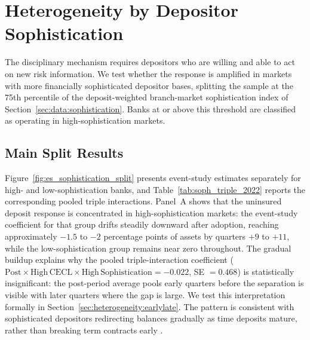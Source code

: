 
\section{Heterogeneity by Depositor Sophistication}
\label{sec:heterogeneity}
\label{sec:results:sophistication}
\label{sec:results:heterogeneity}

The disciplinary mechanism requires depositors who are willing and able to act
on new risk information.  We test whether the response is amplified in markets
with more financially sophisticated depositor bases, splitting the sample at the
75th percentile of the deposit-weighted branch-market sophistication index of
Section~\ref{sec:data:sophistication}.  Banks at or above this threshold
are classified as operating in high-sophistication markets.

\subsection{Main Split Results}
\label{sec:heterogeneity:main}

Figure~\ref{fig:es_sophistication_split} presents event-study estimates separately
for high- and low-sophistication banks, and
Table~\ref{tab:soph_triple_2022} reports the corresponding pooled triple
interactions.  Panel~A shows that the uninsured deposit
response is concentrated in high-sophistication markets: the event-study
coefficient for that group drifts steadily downward after adoption, reaching
approximately $-1.5$ to $-2$ percentage points of assets by quarters $+9$ to $+11$,
while the low-sophistication group remains near zero throughout.  The gradual
buildup explains why the pooled triple-interaction coefficient ($\mathrm{Post}
\times \mathrm{High\,CECL} \times \mathrm{High\,Sophistication} = -0.022$,
SE $= 0.468$) is statistically insignificant: the post-period average pools early
quarters before the separation is visible with later quarters where the gap is
large.  We test this interpretation formally in
Section~\ref{sec:heterogeneity:earlylate}.  The pattern is consistent with
sophisticated depositors redirecting
balances gradually as time deposits mature, rather than breaking term contracts
early \citep{iyer2016tale}.


